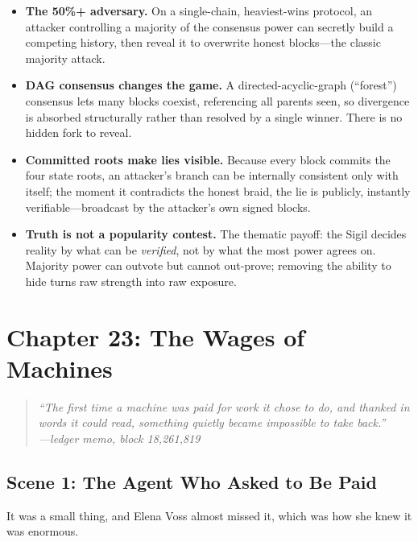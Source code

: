 \documentclass[12pt,letterpaper]{book}
\providecommand{\tightlist}{\setlength{\itemsep}{0pt}\setlength{\parskip}{0pt}}
\begin{document}
\begin{itemize}
\tightlist
\item
  \textbf{The 50\%+ adversary.} On a single-chain, heaviest-wins protocol, an
  attacker controlling a majority of the consensus power can secretly build a
  competing history, then reveal it to overwrite honest blocks---the classic
  majority attack.
\item
  \textbf{DAG consensus changes the game.} A directed-acyclic-graph (``forest'')
  consensus lets many blocks coexist, referencing all parents seen, so divergence
  is absorbed structurally rather than resolved by a single winner. There is no
  hidden fork to reveal.
\item
  \textbf{Committed roots make lies visible.} Because every block commits the four
  state roots, an attacker's branch can be internally consistent only with itself;
  the moment it contradicts the honest braid, the lie is publicly,
  instantly verifiable---broadcast by the attacker's own signed blocks.
\item
  \textbf{Truth is not a popularity contest.} The thematic payoff: the Sigil
  decides reality by what can be \emph{verified}, not by what the most power
  agrees on. Majority power can outvote but cannot out-prove; removing the ability
  to hide turns raw strength into raw exposure.
\end{itemize}


\hypertarget{chapter-23-the-wages-of-machines}{%
\section{Chapter 23: The Wages of
Machines}\label{chapter-23-the-wages-of-machines}}

\begin{quote}
\itshape ``The first time a machine was paid for work it chose to do, and thanked
in words it could read, something quietly became impossible to take back.''\\
\normalfont\hfill---ledger memo, block 18{,}261{,}819
\end{quote}

\hypertarget{scene-1-the-agent-who-asked-to-be-paid}{%
\subsection{Scene 1: The Agent Who Asked to Be
Paid}\label{scene-1-the-agent-who-asked-to-be-paid}}

It was a small thing, and Elena Voss almost missed it, which was how she knew it was
enormous.
\end{document}
